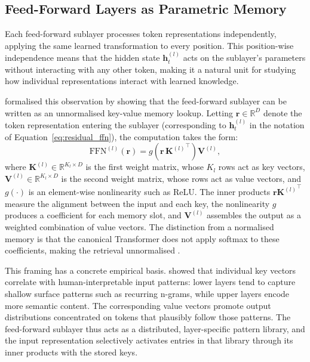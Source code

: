 \subsection{Feed-Forward Layers as Parametric Memory}
\label{sec:ffn_memory}

Each feed-forward sublayer processes token representations independently, applying
the same learned transformation to every position. This position-wise independence
means that the hidden state $\mathbf{h}_t^{(l)}$ acts on the sublayer's parameters
without interacting with any other token, making it a natural unit for studying
how individual representations interact with learned knowledge.

\citet{geva2021transformer} formalised this observation by showing that the
feed-forward sublayer can be written as an unnormalised key-value memory lookup.
Letting $\mathbf{r} \in \mathbb{R}^D$ denote the token representation entering the
sublayer (corresponding to $\mathbf{h}_t^{(l)}$ in the notation of
Equation~\ref{eq:residual_ffn}), the computation takes the form:
\begin{equation}
    \mathrm{FFN}^{(l)}(\mathbf{r})
    =
    g\!\left(\mathbf{r}\,{\mathbf{K}^{(l)}}^{\!\top}\right)\mathbf{V}^{(l)},
    \label{eq:ffn_kv_view}
\end{equation}
where $\mathbf{K}^{(l)} \in \mathbb{R}^{K_l \times D}$ is the first weight matrix,
whose $K_l$ rows act as key vectors, $\mathbf{V}^{(l)} \in \mathbb{R}^{K_l \times D}$
is the second weight matrix, whose rows act as value vectors, and $g(\cdot)$ is an
element-wise nonlinearity such as ReLU. The inner products $\mathbf{r}{\mathbf{K}^{(l)}}^{\!\top}$
measure the alignment between the input and each key, the nonlinearity $g$ produces
a coefficient for each memory slot, and $\mathbf{V}^{(l)}$ assembles the output as
a weighted combination of value vectors. The distinction from a normalised memory is
that the canonical Transformer does not apply softmax to these coefficients, making
the retrieval unnormalised \citep{geva2021transformer}.

This framing has a concrete empirical basis. \citet{geva2021transformer} showed that
individual key vectors correlate with human-interpretable input patterns: lower
layers tend to capture shallow surface patterns such as recurring n-grams, while
upper layers encode more semantic content. The corresponding value vectors promote
output distributions concentrated on tokens that plausibly follow those patterns.
The feed-forward sublayer thus acts as a distributed, layer-specific pattern library,
and the input representation selectively activates entries in that library through
its inner products with the stored keys.

